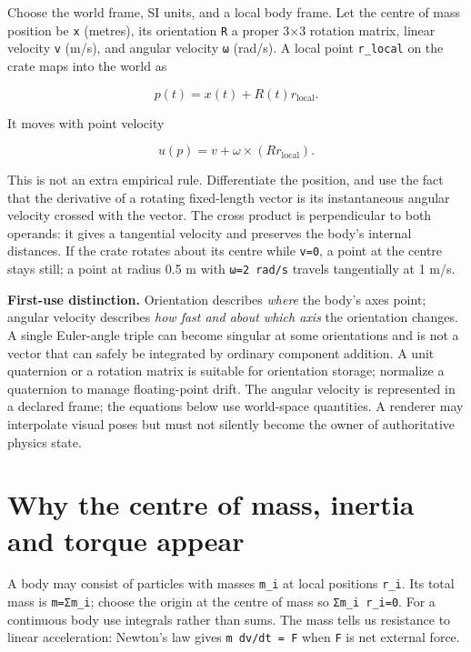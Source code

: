 Choose the world frame, SI units, and a local body frame. Let the centre of mass position be \texttt{x} (metres), its orientation \texttt{R} a proper 3×3 rotation matrix, linear velocity \texttt{v} (m/s), and angular velocity \texttt{ω} (rad/s). A local point \texttt{r\_local} on the crate maps into the world as

\[
p(t)=x(t)+R(t)r_{\mathrm{local}}.
\]

It moves with point velocity

\[
u(p)=v+\omega\times(Rr_{\mathrm{local}}).
\]

This is not an extra empirical rule. Differentiate the position, and use the fact that the derivative of a rotating fixed-length vector is its instantaneous angular velocity crossed with the vector. The cross product is perpendicular to both operands: it gives a tangential velocity and preserves the body's internal distances. If the crate rotates about its centre while \texttt{v=0}, a point at the centre stays still; a point at radius 0.5 m with \texttt{\textbar{}ω\textbar{}=2\ rad/s} travels tangentially at 1 m/s.

\textbf{First-use distinction.} Orientation describes \emph{where} the body's axes point; angular velocity describes \emph{how fast and about which axis} the orientation changes. A single Euler-angle triple can become singular at some orientations and is not a vector that can safely be integrated by ordinary component addition. A unit quaternion or a rotation matrix is suitable for orientation storage; normalize a quaternion to manage floating-point drift. The angular velocity is represented in a declared frame; the equations below use world-space quantities. A renderer may interpolate visual poses but must not silently become the owner of authoritative physics state.

\section{Why the centre of mass, inertia and torque appear}\label{06-engine-ii-ch033-why-the-centre-of-mass-inertia-and-torque-appear}

A body may consist of particles with masses \texttt{m\_i} at local positions \texttt{r\_i}. Its total mass is \texttt{m=Σm\_i}; choose the origin at the centre of mass so \texttt{Σm\_i\ r\_i=0}. For a continuous body use integrals rather than sums. The mass tells us resistance to linear acceleration: Newton's law gives \texttt{m\ dv/dt\ =\ F} when \texttt{F} is net external force.

